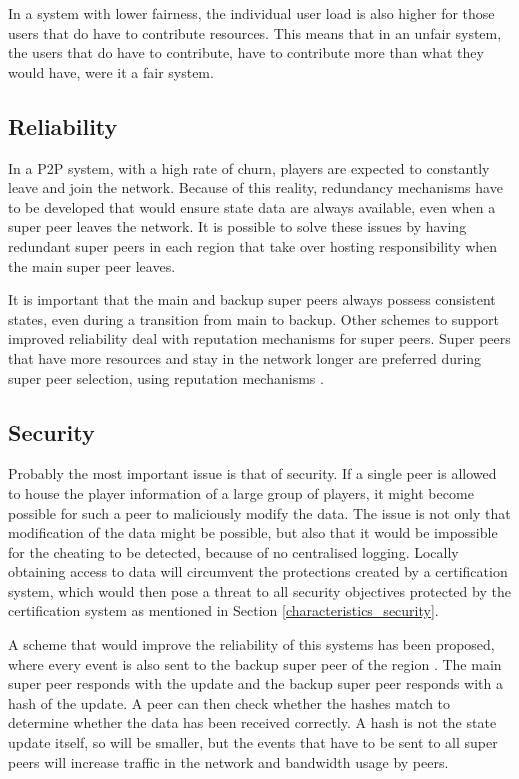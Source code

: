 In a system with lower fairness, the individual user load is also higher for those users that do have to contribute resources. This means that in an
unfair system, the users that do have to contribute, have to contribute more than what they would have, were it a fair system.

\subsection{Reliability}
\label{super_peer_storage_reliability}

In a P2P system, with a high rate of churn, players are expected to constantly leave and join the network. Because of this reality, redundancy
mechanisms have to be developed that would ensure state data are always available, even when a super peer leaves the network. It is possible to solve
these issues by having redundant super peers in each region that take over hosting responsibility when the main super peer leaves.

It is important that the main and backup super peers always possess consistent states, even during a transition from main to backup. Other schemes to
support improved reliability deal with reputation mechanisms for super peers. Super peers that have more resources and stay in the network longer are
preferred during super peer selection, using reputation mechanisms \cite{fan_mediator_paper}.

\subsection{Security}

Probably the most important issue is that of security. If a single peer is allowed to house the player information of a large group of players, it
might become possible for such a peer to maliciously modify the data. The issue is not only that modification of the data might be possible, but also
that it would be impossible for the cheating to be detected, because of no centralised logging. Locally obtaining access to data will circumvent the
protections created by a certification system, which would then pose a threat to all security objectives protected by the certification system as
mentioned in Section \ref{characteristics_security}.

A scheme that would improve the reliability of this systems has been proposed, where every event is also sent to the backup super peer of the region
\cite{past_storage_focus}. The main super peer responds with the update and the backup super peer responds with a hash of the update. A peer can then
check whether the hashes match to determine whether the data has been received correctly. A hash is not the state update itself, so will be smaller,
but the events that have to be sent to all super peers will increase traffic in the network and bandwidth usage by peers.

